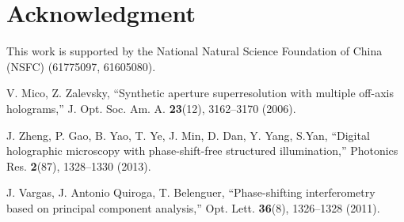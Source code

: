 \documentclass[letterpaper,10pt]{article}
\begin{document}
\section{Acknowledgment}
This work is supported by the National Natural Science Foundation of China (NSFC) (61775097, 61605080).

\begin{thebibliography}{99} %

 V. Mico, Z. Zalevsky, ``Synthetic aperture superresolution with multiple off-axis holograms,''
J. Opt. Soc. Am. A. \textbf{23}(12), 3162--3170 (2006).

 J. Zheng, P. Gao, B. Yao, T. Ye, J. Min, D. Dan, Y. Yang, S.Yan, ``Digital holographic microscopy with phase-shift-free structured illumination,''
Photonics Res. \textbf{2}(87), 1328--1330 (2013).

 J. Vargas, J. Antonio Quiroga, T. Belenguer, ``Phase-shifting interferometry based on principal component analysis,''
Opt. Lett. \textbf{36}(8), 1326--1328 (2011).

\end{thebibliography}
\end{document}
